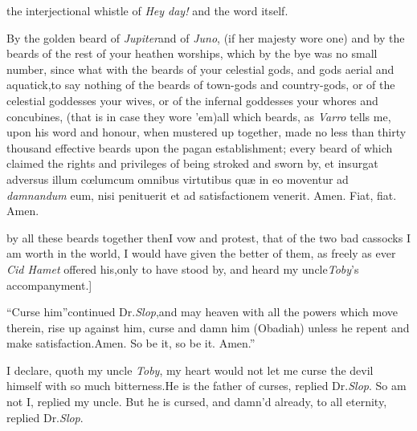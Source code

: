 \documentclass{article}
\begin{document}
\noindent
{}

\noindent
{}
\stick{[Here my uncle \textit{Toby} throwing back his}
\newpage
\null
\newpage
\noindent
the interjectional whistle of \textit{Hey day!} and the word itself.\tsh

\tsk By the golden beard of \textit{Jupiter}\tsk and of \textit{Juno}, (if her
majesty wore one) and by the beards of the rest of your heathen worships, which by
the bye was no small number, since what with the beards of your celestial gods, and
gods aerial and aquatick,\tsk to say nothing of the beards of town-gods and
country-gods, or of the celestial goddesses your wives, or of the infernal goddesses
your whores and concubines, (that is in case they wore ’em)\tsh all which beards, as
\textit{Varro} tells me, upon his word and honour, when mustered up together, made
no less than thirty thousand effective beards upon the pagan establishment;\tsh
every beard of which claimed the rights and privileges of being
stroked and sworn
by,\tsk{}
\null
\vfill
\noindent
\tsh et insurgat adversus illum cœlum\break cum omnibus virtutibus quæ in eo moventur ad \textit{damnandum}
eum, nisi penituerit et ad satisfactionem venerit. \quad Amen.  Fiat, fiat. \quad Amen.
\vfill
\newpage

\noindent
by all these beards together
then\tsh I vow and protest, that of the two bad cassocks I
am worth in the world, I would have given the better of them, as
freely as ever \textit{Cid Hamet} offered his,\tsh only to have
stood by, and heard my uncle\break \textit{Toby}’s accompanyment.]

\tsh “Curse him”\tsh continued\break
Dr.\@ \textit{Slop},\tsh\lqq and may heaven with\break
\lqq all the powers which move therein,\break
\lqq rise up against him, curse and damn\break
\lqq him (Obadiah) unless he repent and\break
\lqq make satisfaction.\quad Amen. So be it,\break
\lqq \tsk so be it. Amen.”

I declare, quoth my uncle \textit{Toby}, my heart would not let me
curse the devil himself with so much bitterness.\tsk He is the
father of curses, replied Dr.\@ \textit{Slop}.\break
\tsh So am not I, replied my uncle.\tsh{}
But he is cursed, and damn’d already, to all eternity, replied Dr.\@ \textit{Slop}.
\end{document}
